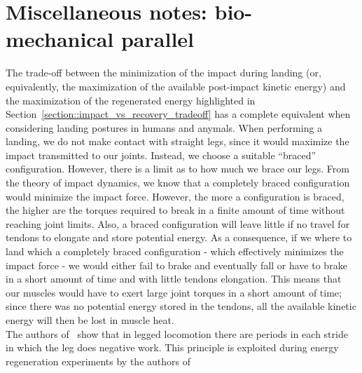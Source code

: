 \documentclass[letterpaper, 10 pt, conference]{ieeeconf}  %
\begin{document}
\section{Miscellaneous notes: bio-mechanical parallel}\label{section::energy_recovery_biomech}
The trade-off between the minimization of the impact during landing (or, equivalently, the maximization of the available post-impact kinetic energy) and the maximization of the regenerated energy highlighted in Section~\ref{section::impact_vs_recovery_tradeoff} has a complete equivalent when considering landing postures in humans and anymals. When performing a landing, we do not make contact with straight legs, since it would maximize the impact transmitted to our joints. Instead, we choose a suitable \enquote{braced} configuration. However, there is a limit as to how much we brace our legs. From the theory of impact dynamics, we know that a completely braced configuration would minimize the impact force. However, the more a configuration is braced, the higher are the torques required to break in a finite amount of time without reaching joint limits. Also, a braced configuration will leave little if no travel for tendons to elongate and store potential energy. As a consequence, if we where to land which a completely braced configuration - which effectively minimizes the impact force - we would either fail to brake and eventually fall or have to brake in a short amount of time and with little tendons elongation. This means that our muscles would have to exert large joint torques in a short amount of time; since there was no potential energy stored in the tendons, all the available kinetic energy will then be lost in muscle heat.\\
The authors of~\cite{} show that in legged locomotion there are periods in each stride in which the leg does negative work. This principle is exploited during energy regeneration experiments by the authors of~\cite{reg_braking::seok2014design}\clearpage
\end{document}
